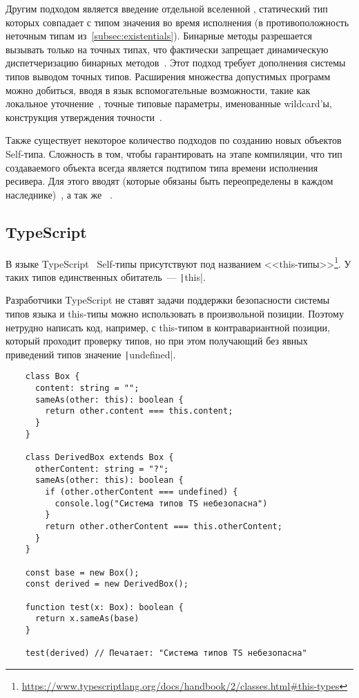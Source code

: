 Другим подходом является введение отдельной вселенной , статический тип которых совпадает с типом значения во время исполнения (в противоположность неточным типам из~\ref{subsec:existentials}).
Бинарные методы разрешается вызывать только на точных типах, что фактически запрещает динамическую диспетчеризацию бинарных методов~\cite{bruce1997increasing}.
Этот подход требует дополнения системы типов выводом точных типов.
Расширения множества допустимых программ можно добиться, вводя в язык вспомогательные возможности, такие как локальное уточнение~\cite{saito2009matching}, точные типовые параметры, именованные wildcard'ы, конструкция утверждения точности~\cite{ryu2016thistype}.

Также существует некоторое количество подходов по созданию новых объектов Self-типа.
Сложность в том, чтобы гарантировать на этапе компиляции, что тип создаваемого объекта всегда является подтипом типа времени исполнения ресивера.
Для этого вводят  (которые обязаны быть переопределены в каждом наследнике)~\cite{saito2009matching}, а так же ~\cite{ryu2016thistype}.


\subsection{TypeScript}

В языке TypeScript~\cite{bierman2014understanding} Self-типы присутствуют под названием <<this-типы>>\footnote{\url{https://www.typescriptlang.org/docs/handbook/2/classes.html\#this-types}}.
У таких типов единственных обитатель~--- \texttt|this|.

Разработчики TypeScript не ставят задачи поддержки безопасности системы типов языка и this-типы можно использовать в произвольной позиции.
Поэтому нетрудно написать код, например, с this-типом в контравариантной позиции, который проходит проверку типов, но при этом получающий без явных приведений типов значение \texttt|undefined|.

\begin{verbatim}
    class Box {
      content: string = "";
      sameAs(other: this): boolean {
        return other.content === this.content;
      }
    }

    class DerivedBox extends Box {
      otherContent: string = "?";
      sameAs(other: this): boolean {
        if (other.otherContent === undefined) {
          console.log("Система типов TS небезопасна")
        }
        return other.otherContent === this.otherContent;
      }
    }

    const base = new Box();
    const derived = new DerivedBox();

    function test(x: Box): boolean {
      return x.sameAs(base)
    }

    test(derived) // Печатает: "Система типов TS небезопасна"
\end{verbatim}


